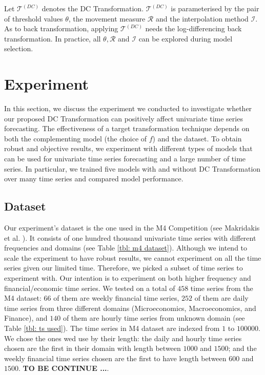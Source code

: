 Let $\mathcal{T}^{(DC)}$ denotes the DC Transformation. $\mathcal{T}^{(DC)}$ is parameterised by the pair of threshold values $\theta$, the movement measure $\mathcal{R}$ and the interpolation method $\mathcal{I}$. As to back transformation, applying $\mathcal{T}^{(DC)}$ needs the log-differencing back transformation. In practice, all $\theta, \mathcal{R}$ and $\mathcal{I}$ can be explored during model selection.

\section{Experiment}\label{sec: experiment}
In this section, we discuss the experiment we conducted to investigate whether our proposed DC Transformation can positively affect univariate time series forecasting. The effectiveness of a target transformation technique depends on both the complementing model (the choice of $f$) and the dataset. To obtain robust and objective results, we experiment with different types of models that can be used for univariate time series forecasting and a large number of time series. In particular, we trained five models with and without DC Transformation over many time series and compared model performance.

\subsection{Dataset}
Our experiment's dataset is the one used in the M4 Competition (see Makridakis et al. \citeyear{MAKRIDAKIS202054}). It consists of one hundred thousand univariate time series with different frequencies and domains (see Table \ref{tbl: m4 dataset}). Although we intend to scale the experiment to have robust results, we cannot experiment on all the time series given our limited time. Therefore, we picked a subset of time series to experiment with. Our intention is to experiment on both higher frequency and financial/economic time series. We tested on a total of $458$ time series from the M4 dataset: $66$ of them are weekly financial time series, $252$ of them are daily time series from three different domains (Microeconomics, Macroeconomics, and Finance), and $140$ of them are hourly time series from unknown domain (see Table \ref{tbl: ts used}). The time series in M4 dataset are indexed from $1$ to $100000$. We chose the ones wed use by their length: the daily and hourly time series chosen are the first in their domain with length between $1000$ and $1500$; and the weekly financial time series chosen are the first to have length between $600$ and $1500$.  \textbf{TO BE CONTINUE ...}.

